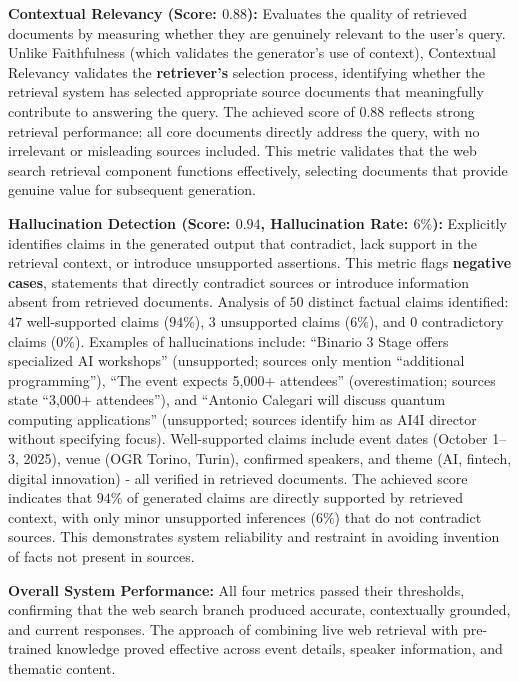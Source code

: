 \textbf{Contextual Relevancy (Score: \( 0.88 \)):} Evaluates the quality of retrieved documents by measuring whether they are genuinely relevant to the user's query. Unlike Faithfulness (which validates the generator's use of context), Contextual Relevancy validates the \textbf{retriever's} selection process, identifying whether the retrieval system has selected appropriate source documents that meaningfully contribute to answering the query. The achieved score of \( 0.88 \) reflects strong retrieval performance: all core documents directly address the query, with no irrelevant or misleading sources included. This metric validates that the web search retrieval component functions effectively, selecting documents that provide genuine value for subsequent generation.

\textbf{Hallucination Detection (Score: \( 0.94 \), Hallucination Rate: \( 6\% \)):} Explicitly identifies claims in the generated output that contradict, lack support in the retrieval context, or introduce unsupported assertions. This metric flags \textbf{negative cases}, statements that directly contradict sources or introduce information absent from retrieved documents. Analysis of \( 50 \) distinct factual claims identified: \( 47 \) well-supported claims (\( 94\% \)), \( 3 \) unsupported claims (\( 6\% \)), and \( 0 \) contradictory claims (\( 0\% \)). Examples of hallucinations include: ``Binario 3 Stage offers specialized AI workshops'' (unsupported; sources only mention ``additional programming''), ``The event expects 5,000+ attendees'' (overestimation; sources state ``3,000+ attendees''), and ``Antonio Calegari will discuss quantum computing applications'' (unsupported; sources identify him as AI4I director without specifying focus). Well-supported claims include event dates (October 1--3, 2025), venue (OGR Torino, Turin), confirmed speakers, and theme (AI, fintech, digital innovation) - all verified in retrieved documents. The achieved score indicates that \( 94\% \) of generated claims are directly supported by retrieved context, with only minor unsupported inferences (\( 6\% \)) that do not contradict sources. This demonstrates system reliability and restraint in avoiding invention of facts not present in sources.

\vspace{0.3cm}

\noindent \textbf{Overall System Performance:} All four metrics passed their thresholds, confirming that the web search branch produced accurate, contextually grounded, and current responses. The approach of combining live web retrieval with pre-trained knowledge proved effective across event details, speaker information, and thematic content.




